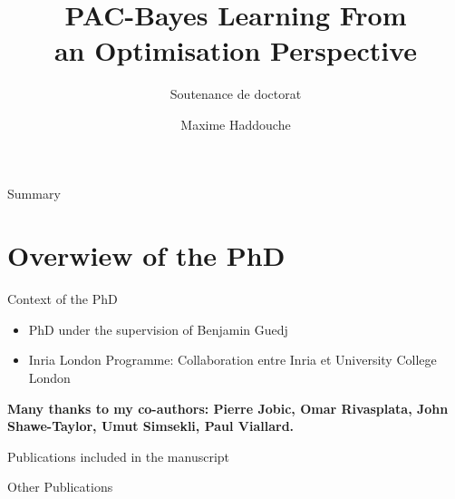 \documentclass{presentation}
\title{PAC-Bayes Learning From\\ an Optimisation Perspective}
\subtitle{Soutenance de doctorat}
\author{\vspace{-1.5cm}
 Maxime Haddouche}
\institute{
\vspace{1.8cm}
Inria London\\
Université de Lille\\
}
\date{\vspace{0.5cm}

{\bf Mercredi 2 Octobre 2024}}
\begin{document}
\begin{xframe}{}
    \maketitle
\end{xframe}


\begin{xframe}{Summary}
    \tableofcontents
\end{xframe}

\section{Overwiew of the PhD}

    \begin{xframe}{Context of the PhD}
        \vspace{1cm}
        \begin{itemize}
            \item PhD under the supervision of Benjamin Guedj
            \item Inria London Programme: Collaboration entre Inria et University College London
        \end{itemize}
    \vspace{0.5cm}
        \begin{blackblock}{}
            {\bf \Large Many thanks to my co-authors: Pierre Jobic, Omar Rivasplata, John Shawe-Taylor, Umut Simsekli, Paul Viallard.}
        \end{blackblock}
    \end{xframe}

    \begin{frame}[allowframebreaks]{Publications included in the manuscript}
        \begin{refsection}
            \nocite{*}
            \printbibliography[heading={subbibliography}, keyword={conference}, title={Conference article}]
            \printbibliography[heading={subbibliography}, keyword={journal}, title={Journal article}]
            \printbibliography[heading={subbibliography}, keyword={report}, title={Research Report}]
            \end{refsection}
    \end{frame}

    \begin{frame}[allowframebreaks]{Other Publications}
        \begin{refsection}
            \nocite{*}
            \printbibliography[heading={subbibliography}, keyword={conference}, title={Conference article}]
            \printbibliography[heading={subbibliography}, keyword={journal}, title={Journal article}]
            \printbibliography[heading={subbibliography}, keyword={report}, title={Research Report}]
            \end{refsection}
    \end{frame}
\end{document}
